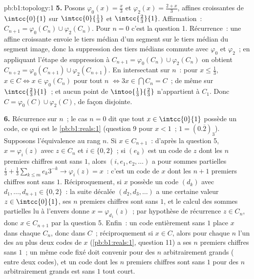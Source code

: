 \begin{solution}{pb:b1:topology:1}
\textbf{5.} Posons $\varphi_0(x) = \frac x3$ et $\varphi_2(x) =
\frac{2 + x}{3}$,  affines croissantes de $\intcc{0}{1}$
sur $\intcc{0}{\frac13}$ et $\intcc{\frac23}{1}$. Affirmation~:
$C_{n+1} = \varphi_0(C_n) \cup \varphi_2(C_n)$. Pour $n = 0$ c'est
la question 1. Récurrence~: une  affine croissante envoie
le tiers médian d'un segment sur le tiers médian du segment image,
donc la suppression des tiers médians commute avec $\varphi_0$ et
$\varphi_2$~; en appliquant l'étape de suppression à $C_{n+1} =
\varphi_0(C_n) \cup \varphi_2(C_n)$ on obtient $C_{n+2} =
\varphi_0(C_{n+1}) \cup \varphi_2(C_{n+1})$. En intersectant sur
$n$~: pour $x \leq \frac13$, $x \in C \iff x \in \varphi_0(C_n)$
pour tout $n$ $\iff 3x \in \bigcap C_n = C$~; de même sur
$\intcc{\frac23}{1}$~; et aucun point de $\intoo{\frac13}{\frac23}$
n'appartient à $C_1$. Donc $C = \varphi_0(C) \cup \varphi_2(C)$, de
façon disjointe.

\textbf{6.} Récurrence sur $n$~; le cas $n = 0$ dit que tout $x \in
\intcc{0}{1}$ possède un code, ce qui est le \cref{pb:b1:reals:1}
(question 9 pour $x < 1$~; $1 = (0.\overline 2)_3$). Supposons
l'équivalence au rang $n$. Si $x \in C_{n+1}$~: d'après la question
5, $x = \varphi_i(z)$ avec $z \in C_n$ et $i \in \{0, 2\}$~; si
$(e_k)$ est un code de $z$ dont les $n$ premiers chiffres sont sans
$1$, alors $(i, e_1, e_2, \dots)$ a pour sommes partielles $\frac i3
+ \frac13\sum_{k\leq m} e_k 3^{-k} \to \varphi_i(z) = x$~: c'est un
code de $x$ dont les $n + 1$ premiers chiffres sont sans $1$.
Réciproquement, si $x$ possède un code $(d_k)$ avec $d_1, \dots,
d_{n+1} \in \{0, 2\}$~: la suite décalée $(d_2, d_3, \dots)$ a une
certaine valeur $z \in \intcc{0}{1}$, ses $n$ premiers chiffres sont
sans $1$, et le calcul des sommes partielles lu à l'envers donne
$x = \varphi_{d_1}(z)$~; par hypothèse de récurrence $z \in C_n$,
donc $x \in C_{n+1}$ par la question 5. Enfin~: un code entièrement
sans $1$ place $x$ dans chaque $C_n$, donc dans $C$~; réciproquement
si $x \in C$, alors pour chaque $n$ l'un des au plus deux codes de
$x$ (\cref{pb:b1:reals:1}, question 11) a ses $n$ premiers chiffres
sans $1$~; un même code fixé doit convenir pour des $n$
arbitrairement grands ( entre deux codes), et un
code dont les $n$ premiers chiffres sont sans $1$ pour des $n$
arbitrairement grands est sans $1$ tout court.


\end{solution}
